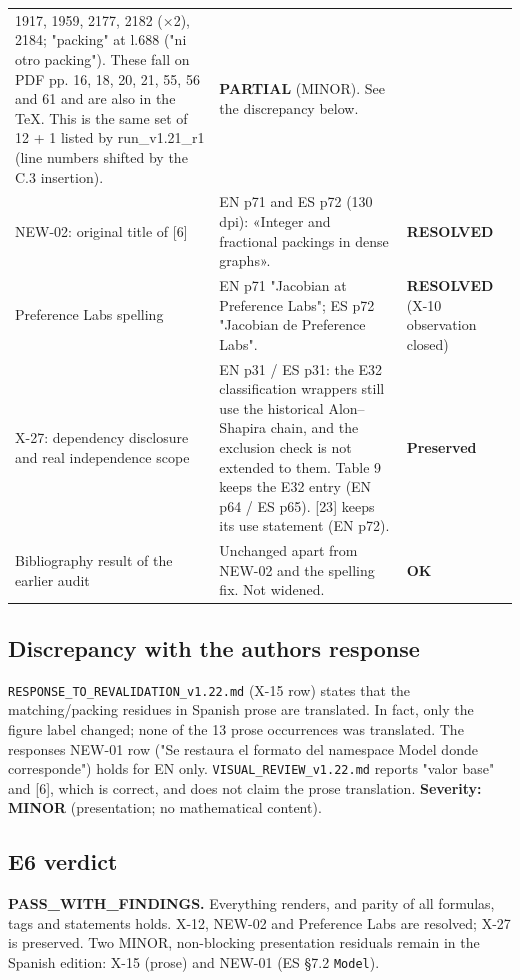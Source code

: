 \documentclass[
]{article}
\newcounter{none} %
\begin{document}
{\begin{longtable}[]{@{}lll@{}}
1917, 1959, 2177, 2182 (×2), 2184; "packing" at l.688 ("ni otro
packing"). These fall on PDF pp. 16, 18, 20, 21, 55, 56 and 61 and are
also in the TeX. This is the same set of 12 + 1 listed by run\_v1.21\_r1
(line numbers shifted by the C.3 insertion). & \textbf{PARTIAL} (MINOR).
See the discrepancy below. \\
NEW-02: original title of {[}6{]} & EN p71 and ES p72 (130 dpi):
«Integer and fractional packings in dense graphs». &
\textbf{RESOLVED} \\
Preference Labs spelling & EN p71 "Jacobian at Preference Labs"; ES p72
"Jacobian de Preference Labs". & \textbf{RESOLVED} (X-10 observation
closed) \\
X-27: dependency disclosure and real independence scope & EN p31 / ES
p31: the E32 classification wrappers still use the historical
Alon--Shapira chain, and the exclusion check is not extended to them.
Table 9 keeps the E32 entry (EN p64 / ES p65). {[}23{]} keeps its use
statement (EN p72). & \textbf{Preserved} \\
Bibliography result of the earlier audit & Unchanged apart from NEW-02
and the spelling fix. Not widened. & \textbf{OK} \\
\end{longtable}
}

\subsection{Discrepancy with the author\textquotesingle s
response}\label{discrepancy-with-the-authors-response}

\texttt{RESPONSE\_TO\_REVALIDATION\_v1.22.md} (X-15 row) states that the
matching/packing residues in Spanish prose are translated. In fact, only
the figure label changed; none of the 13 prose occurrences was
translated. The response\textquotesingle s NEW-01 row ("Se restaura el
formato del namespace Model donde corresponde") holds for EN only.
\texttt{VISUAL\_REVIEW\_v1.22.md} reports "valor base" and {[}6{]},
which is correct, and does not claim the prose translation.
\textbf{Severity: MINOR} (presentation; no mathematical content).

\subsection{E6 verdict}\label{e6-verdict}

\textbf{PASS\_WITH\_FINDINGS.} Everything renders, and parity of all
formulas, tags and statements holds. X-12, NEW-02 and Preference Labs
are resolved; X-27 is preserved. Two MINOR, non-blocking presentation
residuals remain in the Spanish edition: X-15 (prose) and NEW-01 (ES
§7.2 \texttt{Model}).
\end{document}
